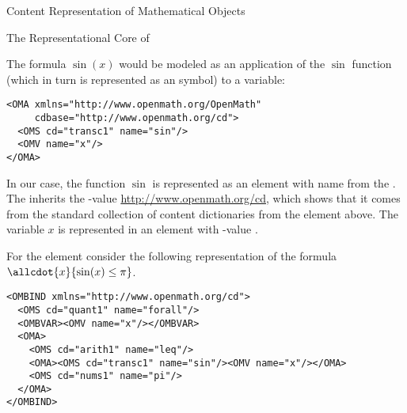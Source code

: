 \begin{omgroup}[id=mobj.core]{Content Representation of Mathematical Objects}
\begin{module}[id=OpenMath]
\begin{omgroup}[id=openmath]{The Representational Core of \openmath}
\begin{example}
  The formula $\sin(x)$ would be modeled as an application of the $\sin$ function (which
  in turn is represented as an {\openmath} symbol) to a variable:
\begin{lstlisting}[label=sinx,language=OpenMath,numbers=none,index={OMA,OMV,OMS}]
<OMA xmlns="http://www.openmath.org/OpenMath"
     cdbase="http://www.openmath.org/cd">
  <OMS cd="transc1" name="sin"/>
  <OMV name="x"/>
</OMA>
\end{lstlisting}
  In our case, the function $\sin$ is represented as an  element
  with name {} from the {}
  {}. The  inherits the
  {}-value \url{http://www.openmath.org/cd}, which shows that it
  comes from the {\openmath} standard collection of content dictionaries from the
   element above.  The variable $x$ is represented in an
   element with -value
  {}.
\end{example}

\begin{example}
  For the  element consider the following representation of the
  formula $\allcdot{x}{\sin(x)\leq\pi}$.
\begin{lstlisting}[label=allxsinx,language=OpenMath,numbers=none,
   index={OMA,OMV,OMBIND,OMBVAR}]
<OMBIND xmlns="http://www.openmath.org/cd">
  <OMS cd="quant1" name="forall"/>
  <OMBVAR><OMV name="x"/></OMBVAR>
  <OMA>
    <OMS cd="arith1" name="leq"/>
    <OMA><OMS cd="transc1" name="sin"/><OMV name="x"/></OMA>
    <OMS cd="nums1" name="pi"/>
  </OMA>
</OMBIND>
\end{lstlisting}
\end{example}


\end{omgroup}
\end{module}
\end{omgroup}
